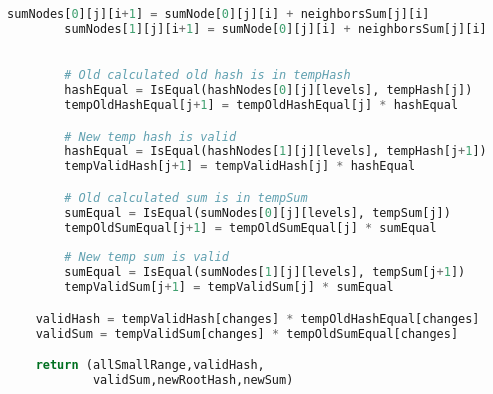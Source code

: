 \begin{lstlisting}[language=Python, caption=Liabilities change circuit pseudocode]
        sumNodes[0][j][i+1] = sumNode[0][j][i] + neighborsSum[j][i]
        sumNodes[1][j][i+1] = sumNode[0][j][i] + neighborsSum[j][i]
            

        # Old calculated old hash is in tempHash
        hashEqual = IsEqual(hashNodes[0][j][levels], tempHash[j])
        tempOldHashEqual[j+1] = tempOldHashEqual[j] * hashEqual

        # New temp hash is valid
        hashEqual = IsEqual(hashNodes[1][j][levels], tempHash[j+1])
        tempValidHash[j+1] = tempValidHash[j] * hashEqual

        # Old calculated sum is in tempSum
        sumEqual = IsEqual(sumNodes[0][j][levels], tempSum[j])
        tempOldSumEqual[j+1] = tempOldSumEqual[j] * sumEqual
        
        # New temp sum is valid
        sumEqual = IsEqual(sumNodes[1][j][levels], tempSum[j+1])
        tempValidSum[j+1] = tempValidSum[j] * sumEqual

    validHash = tempValidHash[changes] * tempOldHashEqual[changes]
    validSum = tempValidSum[changes] * tempOldSumEqual[changes]

    return (allSmallRange,validHash, 
            validSum,newRootHash,newSum)
    
\end{lstlisting}

